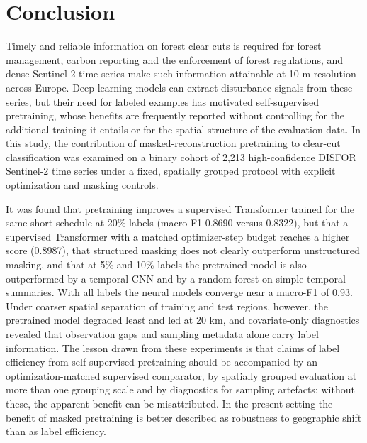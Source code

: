 \documentclass[10pt,a4paper,twocolumn]{article}
\begin{document}
\section{Conclusion}
Timely and reliable information on forest clear cuts is required for forest management, carbon reporting and the enforcement of forest regulations, and dense Sentinel-2 time series make such information attainable at 10 m resolution across Europe. Deep learning models can extract disturbance signals from these series, but their need for labeled examples has motivated self-supervised pretraining, whose benefits are frequently reported without controlling for the additional training it entails or for the spatial structure of the evaluation data. In this study, the contribution of masked-reconstruction pretraining to clear-cut classification was examined on a binary cohort of 2,213 high-confidence DISFOR Sentinel-2 time series under a fixed, spatially grouped protocol with explicit optimization and masking controls.

It was found that pretraining improves a supervised Transformer trained for the same short schedule at 20\% labels (macro-F1 0.8690 versus 0.8322), but that a supervised Transformer with a matched optimizer-step budget reaches a higher score (0.8987), that structured masking does not clearly outperform unstructured masking, and that at 5\% and 10\% labels the pretrained model is also outperformed by a temporal CNN and by a random forest on simple temporal summaries. With all labels the neural models converge near a macro-F1 of 0.93. Under coarser spatial separation of training and test regions, however, the pretrained model degraded least and led at 20 km, and covariate-only diagnostics revealed that observation gaps and sampling metadata alone carry label information. The lesson drawn from these experiments is that claims of label efficiency from self-supervised pretraining should be accompanied by an optimization-matched supervised comparator, by spatially grouped evaluation at more than one grouping scale and by diagnostics for sampling artefacts; without these, the apparent benefit can be misattributed. In the present setting the benefit of masked pretraining is better described as robustness to geographic shift than as label efficiency.
\end{document}
